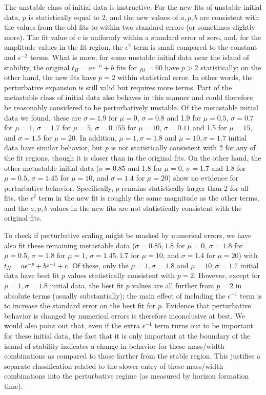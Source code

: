 \documentclass[../PhD.tex]{subfiles}
\begin{document}
The unstable class of initial data is instructive. For the new fits of
unstable initial data, $p$ is statistically equal to 2, and the new values
of $a,p,b$ are consistent with the values from the old fits to within two
standard errors (or sometimes slightly more). The fit value of $c$ is 
uniformly within a standard error of zero, and, for the amplitude values
in the fit region, the $\epsilon^2$ term is small compared to the constant
and $\epsilon^{-2}$ terms. What is more, for some unstable initial data near
the island of stability, the original $t_H=a\epsilon^{-p}+b$ fits for 
$_{fit}=60$ have $p>2$ statistically; on the other hand, the new fits have 
$p=2$ within statistical error. In other words, the perturbative expansion
is still valid but requires more terms. Part of the metastable class of
initial data also behaves in this manner and could therefore be reasonably
considered to be perturbatively unstable. Of the metastable initial
data we found, these are $\sigma=1.9$ for $\mu=0$, $\sigma=0.8$ and 1.9 
for $\mu=0.5$, $\sigma=0.7$ for $\mu=1$, $\sigma=1.7$ for $\mu=5$, 
$\sigma=0.155$ for $\mu=10$, $\sigma=0.11$ and 1.5 for $\mu=15$, and 
$\sigma=1.5$ for $\mu=20$. In addition, $\mu=1,\sigma=1.8$ and 
$\mu=10,\sigma=1.7$ initial data have similar behavior, but $p$ is not
statistically consistent with 2 for any of the fit regions, though it is
closer than in the original fits. On the other hand, the other metastable
initial data ($\sigma=0.85$ and 1.8 for $\mu=0$, $\sigma=1.7$ and 1.8 for 
$\mu=0.5$, $\sigma=1.45$ for $\mu=10$, and $\sigma=1.4$ for $\mu=20$) show 
no evidence for perturbative behavior. Specifically, $p$ remains statistically
larger than 2 for all fits, the $\epsilon^2$ term in the new fit is roughly
the same magnitude as the other terms, and the $a,p,b$ values in the new
fits are not statistically consistent with the original fits.

To check if perturbative scaling might be masked by numerical errors, we
have also fit these remaining metastable data ($\sigma=0.85,1.8$ for $\mu=0$,
$\sigma=1.8$ for $\mu=0.5$, $\sigma=1.8$ for $\mu=1$, $\sigma=1.45,1.7$ for 
$\mu=10$, and $\sigma=1.4$ for $\mu=20$) with 
$t_H=a\epsilon^{-p}+b\epsilon^{-1}+c$. Of these, only the $\mu=1,\sigma=1.8$ and 
$\mu=10,\sigma=1.7$ initial data have best fit $p$ values statistically 
consistent with $p=2$. However, except for $\mu=1,\sigma=1.8$ initial data,
the best fit $p$ values are all further from $p=2$ in absolute terms (usually
substantially); the
main effect of including the $\epsilon^{-1}$ term is to increase the standard
error on the best fit for $p$. Evidence that perturbative behavior
is changed by numerical errors is therefore inconclusive at best. We would 
also point out that, even if the extra $\epsilon^{-1}$ term turns out to be
important for these initial data, the fact that it is only important at 
the boundary of the island of stability indicates a change in behavior for
these mass/width combinations as compared to those farther from the stable
region. This justifies a separate classification related to the slower entry
of these mass/width combinations into the perturbative regime (as measured
by horizon formation time).
\end{document}
